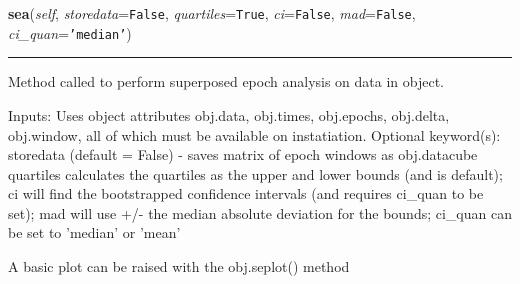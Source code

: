 \hspace{.8\funcindent}\begin{boxedminipage}{\funcwidth}

    \raggedright \textbf{sea}(\textit{self}, \textit{storedata}={\tt False}, \textit{quartiles}={\tt True}, \textit{ci}={\tt False}, \textit{mad}={\tt False}, \textit{ci\_quan}={\tt \texttt{'}\texttt{median}\texttt{'}})

    \vspace{-1.5ex}

    \rule{\textwidth}{0.5\fboxrule}
\setlength{\parskip}{2ex}
    Method called to perform superposed epoch analysis on data in object.

    Inputs: Uses object attributes obj.data, obj.times, obj.epochs, 
    obj.delta, obj.window, all of which must be available on instatiation. 
    Optional keyword(s): storedata (default = False) - saves matrix of 
    epoch windows as obj.datacube quartiles calculates the quartiles as the
    upper and lower bounds (and is default); ci will find the bootstrapped 
    confidence intervals (and requires ci\_quan to be set); mad will use 
    +/- the median absolute deviation for the bounds; ci\_quan can be set 
    to 'median' or 'mean'

    A basic plot can be raised with the obj.seplot() method

\setlength{\parskip}{1ex}
    \end{boxedminipage}

    \label{spacepy:seapy:Sea:plot}

    \vspace{0.5ex}

